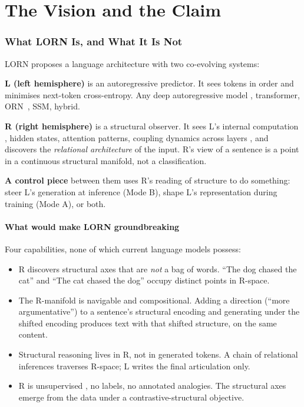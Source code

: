 \documentclass[10pt, twocolumn, a4paper]{article}
\begin{document}
\part{The Vision and the Claim}

\section{What LORN Is, and What It Is Not}

LORN proposes a language architecture with two co-evolving systems:

\textbf{L (left hemisphere)} is an autoregressive predictor. It sees tokens in order and minimises next-token cross-entropy. Any deep autoregressive model ,  transformer, ORN~\cite{orn}, SSM, hybrid.

\textbf{R (right hemisphere)} is a structural observer. It sees L's internal computation ,  hidden states, attention patterns, coupling dynamics across layers ,  and discovers the \emph{relational architecture} of the input. R's view of a sentence is a point in a continuous structural manifold, not a classification.

\textbf{A control piece} between them uses R's reading of structure to do something: steer L's generation at inference (Mode B), shape L's representation during training (Mode A), or both.

\subsection*{What would make LORN groundbreaking}

Four capabilities, none of which current language models possess:

\begin{itemize}[nosep,leftmargin=*]
\item R discovers structural axes that are \emph{not} a bag of words. ``The dog chased the cat'' and ``The cat chased the dog'' occupy distinct points in R-space.
\item The R-manifold is navigable and compositional. Adding a direction (``more argumentative'') to a sentence's structural encoding and generating under the shifted encoding produces text with that shifted structure, on the same content.
\item Structural reasoning lives in R, not in generated tokens. A chain of relational inferences traverses R-space; L writes the final articulation only.
\item R is unsupervised ,  no labels, no annotated analogies. The structural axes emerge from the data under a contrastive-structural objective.
\end{itemize}
\end{document}
